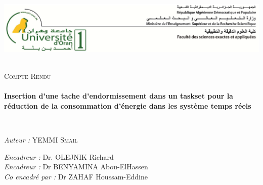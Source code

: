 \begin{titlepage}
  \begin{sffamily}
  \begin{center}

	\begin{center}
	\includegraphics[scale=0.4 ]{logo1.eps}
	\end{center}
    \textsc{}\\[3cm]

    \textsc{\LARGE Compte Rendu}\\[3cm]

    \HRule \\[0.4cm]
    { \Large \bfseries Insertion d'une tache d'endormissement dans un taskset pour la réduction de la consommation d'énergie dans les système temps réels\\[0.4cm] }

    \HRule \\[4cm]

    \begin{minipage}{1\textwidth}
      \begin{flushleft} \large
        \emph{Auteur :} YEMMI \textsc{Smail}\\
      \end{flushleft}
    \end{minipage}
    \begin{minipage}{1\textwidth}
      \begin{flushright} \large
        \emph{Encadreur :} Dr. OLEJNIK Richard\\
        \emph{Encadreur :} Dr BENYAMINA Abou-ElHassen\\
        \emph{Co encadré par : } Dr ZAHAF Houssam-Eddine
      \end{flushright}
    \end{minipage}

    \vfill
  \end{center}
  \end{sffamily}
\end{titlepage}